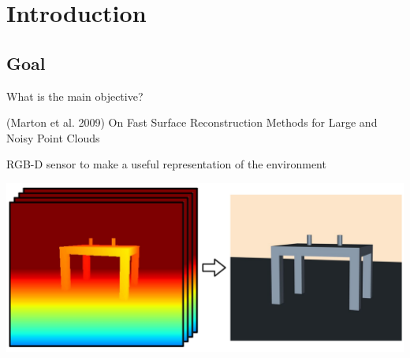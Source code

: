 \section{Introduction}

\subsection{Goal}

\begin{frame}{What is the main objective?}
\begin{reference}{4mm}{90mm}
(Marton et al. 2009) On Fast Surface Reconstruction Methods for Large and Noisy Point Clouds
\end{reference}
  {\small RGB-D sensor to make a useful representation of the environment}
  \begin{center}
  \includegraphics[width=\textwidth]{../figures/intro_goal.pdf}
  \end{center}
\end{frame}

